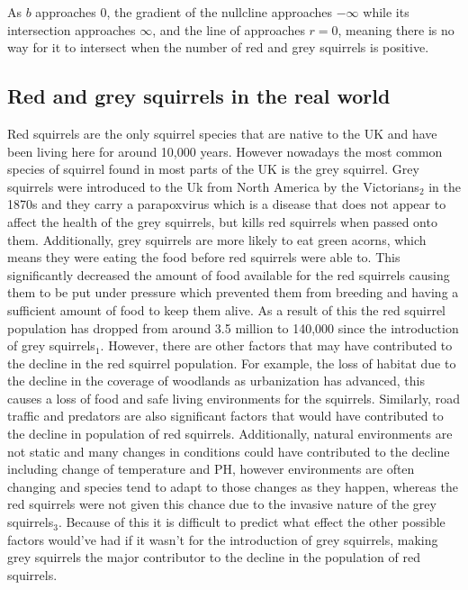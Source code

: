 \documentclass[11pt]{article}
\begin{document}
    As $b$ approaches 0, the gradient of the nullcline approaches $-\infty$ while its intersection approaches $\infty$, and the line of approaches $r=0$, meaning there is no way for it to intersect when the number of red and grey squirrels is positive.

\subsection*{Red and grey squirrels in the real world}

     Red squirrels are the only squirrel species that are native to the UK and have been living here for around 10,000 years. However nowadays the most common species of squirrel found in most parts of the UK is the grey squirrel. Grey squirrels were introduced to the Uk from North America by the Victorians$_{2}$ in the 1870s and they carry a parapoxvirus which is a disease that does not appear to affect the health of the grey squirrels, but kills red squirrels when passed onto them. Additionally, grey squirrels are more likely to eat green acorns, which means they were eating the food before red squirrels were able to. This significantly decreased the amount of food available for the red squirrels causing them to be put under pressure which prevented them from breeding and having a sufficient amount of food to keep them alive. As a result of this the red squirrel population has dropped from around 3.5 million to 140,000 since the introduction of grey squirrels$_{1}$. However, there are other factors that may have contributed to the decline in the red squirrel population. For example, the loss of habitat due to the decline in the coverage of woodlands as urbanization has advanced, this causes a loss of food and safe living environments for the squirrels. Similarly, road traffic and predators are also significant factors that would have contributed to the decline in population of red squirrels. Additionally, natural environments are not static and many changes in conditions could have contributed to the decline including change of temperature and PH, however environments are often changing and species tend to adapt to those changes as they happen, whereas the red squirrels were not given this chance due to the invasive nature of the grey squirrels$_{3}$. Because of this it is difficult to predict what effect the other possible factors would've had if it wasn't for the introduction of grey squirrels, making grey squirrels the major contributor to the decline in the population of red squirrels.
\end{document}
